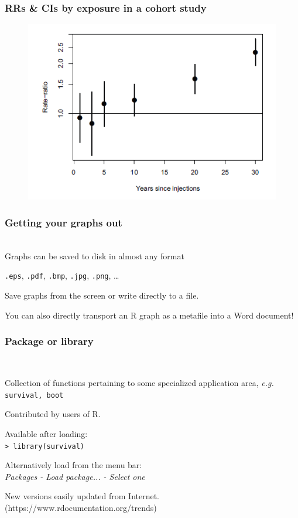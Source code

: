 \documentclass[handout,12pt]{beamer}
\begin{document}
\begin{frame}
\frametitle{RRs \& CIs by exposure in a cohort study}
\begin{figure}
\centering
\includegraphics[width=1.0\linewidth]{RR-CI}
\end{figure}
\end{frame}


 \begin{frame}
 \frametitle{Getting your graphs out}
 \ \\
 
 Graphs can be saved to disk %
 in almost any format %
 \bi
 \item
 \texttt{.eps}, \texttt{.pdf}, \texttt{.bmp}, \texttt{.jpg}, 
 \texttt{.png}, \dots
 \ei
 
 \pause
 \bigskip
 Save graphs from the screen or write directly to
 a file.
 
  \pause\bigskip
 You can also directly transport an R graph as a metafile into a Word document!
\end{frame}


\begin{frame}\frametitle{Package or library}
\ \\
\bi
\item Collection of functions pertaining to some 
    specialized application area, \emph{e.g.}
     {\tt survival, boot}
    \medskip
\item Contributed by users of R.
    \medskip
\item Available after loading:\\
	{\tt > library(survival)  }
	  \medskip
\item Alternatively load from the menu bar: \\
 {\it Packages - Load package... - Select one} 
   \medskip
\item New versions easily updated from Internet.
(https://www.rdocumentation.org/trends)
\ei
\end{frame}  
\end{document}
